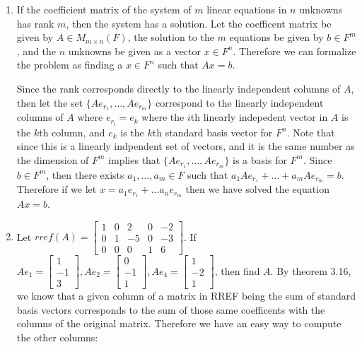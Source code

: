 \documentclass[12pt, letterpaper]{article}
\begin{document}
\begin{enumerate}
	\newpage
	\item If the coefficient matrix of the system of $m$ linear equations in $n$ unknowns has rank $m$, then the system has a solution.  
	Let the coefficent matrix be given by $A \in M_{m \times n} (F)$, the solution to the $m$ equations be given by $b \in F^m$, and the $n$ unknowns be given as a vector $x \in F^n$.  Therefore we can formalize the problem as finding a $x \in F^n$ such that $Ax = b$.  
	\iffalse
	Therefore $rank(A) = m$.  Note that by the rank nullity theorem 
	$rank(A) + nullity(A) = n$.  Since $0\leq nullity(A)$, then $rank(A) \leq n$, thus $m \leq n$.  By the definition of rank, $m = rank(A) = dim(R(T))$.  
	\fi 
	Since the rank corresponds directly to the linearly independent columns of $A$, then let the set $\{Ae_{r_1},\ldots,Ae_{r_m}\}$ correspond to the linearly independent columns of $A$ where $e_{r_i} = e_k$ where the $i$th linearly indepedent vector in $A$ is the $k$th column, and $e_k$ is the $k$th standard basis vector for $F^n$.    Note that since this is a linearly indpendent set of vectors, and it is the same number as the dimension of $F^m$ implies that $\{Ae_{r_1},\ldots,Ae_{r_m}\}$ is a basis for $F^m$.  Since $b \in F^m$, then there exists $a_1,\ldots,a_m \in F$ such that $a_1 Ae_{r_1} + \ldots + a_m Ae_{r_m} = b$.  Therefore if we let $x = a_1 e_{r_1} + \ldots a_n e_{r_m}$ then we have solved the equation $Ax = b$.   
	\newpage
	\item Let $rref(A) = \begin{bmatrix}
	1 & 0 & 2 & 0 & -2\\
	0 & 1 & -5 & 0 & -3\\
	0 & 0 & 0 & 1 & 6
\end{bmatrix}	 $.  If $Ae_1 = \begin{bmatrix}1 \\ -1 \\3 \end{bmatrix},Ae_2 = \begin{bmatrix}0 \\ -1 \\1 \end{bmatrix},Ae_4 = \begin{bmatrix} 1 \\ -2 \\1 \end{bmatrix} $, then find $A$. By theorem 3.16, we know that a given column of a matrix in RREF being the sum of standard basis vectors corresponds to the sum of those same coefficents with the columns of the original matrix.  Therefore we have an easy way to compute the other columns:

\end{enumerate}
\end{document}
